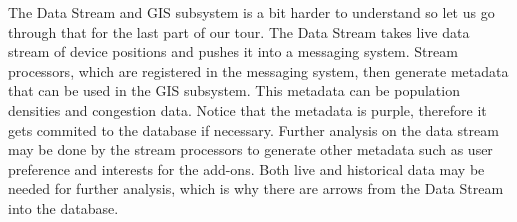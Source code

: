 The Data Stream and GIS subsystem is a bit harder to understand so let us go through that for the last part of our tour. The Data Stream takes live data stream of device positions and pushes it into a messaging system. Stream processors, which are registered in the messaging system, then generate metadata that can be used in the GIS subsystem. This metadata can be population densities and congestion data. Notice that the metadata is purple, therefore it gets commited to the database if necessary. Further analysis on the data stream may be done by the stream processors to generate other metadata such as user preference and interests for the add-ons. Both live and historical data may be needed for further analysis, which is why there are arrows from the Data Stream into the database.
